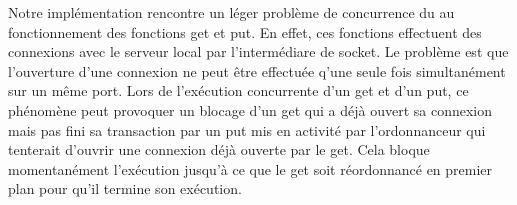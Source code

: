 \documentclass[a4paper, 12pt, twoside]{report}
\begin{document}
Notre implémentation rencontre un léger problème de concurrence du au fonctionnement des fonctions get et put. En effet, 
ces fonctions effectuent des connexions avec le serveur local par l'intermédiare de socket. Le problème est que l'ouverture 
d'une connexion ne peut être effectuée q'une seule fois simultanément sur un même port. Lors de l'exécution concurrente 
d'un get et d'un put, ce phénomène peut provoquer un blocage d'un get qui a déjà ouvert sa connexion mais pas fini sa 
transaction par un put mis en activité par l'ordonnanceur qui tenterait d'ouvrir une connexion déjà ouverte par le get. Cela 
bloque momentanément l'exécution jusqu'à ce que le get soit réordonnancé en premier plan pour qu'il termine son exécution.
\end{document}

